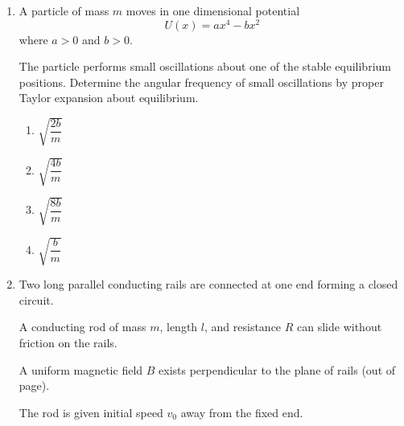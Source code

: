 \documentclass[12pt]{article}
\begin{document}
\begin{enumerate}[leftmargin=*]
A light ray is incident normally on the slab in the laboratory frame.  

Using relativistic velocity transformation to first order in $u/c$, determine the angle of emergence in laboratory frame.

\begin{center}
\end{center}

\begin{enumerate}
\item $0$
\item $\dfrac{u}{c}\left(1-\dfrac{1}{n}\right)$
\item $\dfrac{u}{c}(n-1)$
\item $\dfrac{nu}{c}$
\end{enumerate}

\item A particle of mass $m$ moves in one dimensional potential
\[
U(x)=ax^4-bx^2
\]
where $a>0$ and $b>0$.  

The particle performs small oscillations about one of the stable equilibrium positions.  
Determine the angular frequency of small oscillations by proper Taylor expansion about equilibrium.

\begin{enumerate}
\item $\sqrt{\dfrac{2b}{m}}$
\item $\sqrt{\dfrac{4b}{m}}$
\item $\sqrt{\dfrac{8b}{m}}$
\item $\sqrt{\dfrac{b}{m}}$
\end{enumerate}

\item Two long parallel conducting rails are connected at one end forming a closed circuit.  

A conducting rod of mass $m$, length $l$, and resistance $R$ can slide without friction on the rails.  

A uniform magnetic field $B$ exists perpendicular to the plane of rails (out of page).  

The rod is given initial speed $v_0$ away from the fixed end.  


\end{enumerate}
\end{document}
